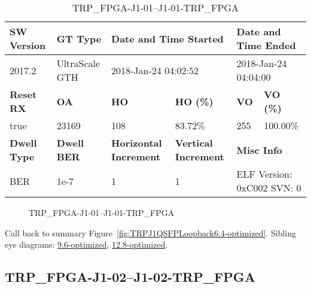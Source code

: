 \begin{table}[h]
\centering
\caption{TRP\_FPGA-J1-01--J1-01-TRP\_FPGA}
\label{tab:TRPFPGAJ101J101TRPFPGA6.4-optimized}
\begin{tabular}{@{}|l|l|l|l|l|l|@{}}
\toprule
\textbf{SW Version}                & \textbf{GT Type}   & \multicolumn{2}{l|}{\textbf{Date and Time Started}}            & \multicolumn{2}{l|}{\textbf{Date and Time Ended}}        \\ \midrule
2017.2                       & UltraScale GTH          & \multicolumn{2}{l|}{2018-Jan-24 04:02:52}                   & \multicolumn{2}{l|}{2018-Jan-24 04:04:00}               \\ \midrule
\textbf{Reset RX}                  & \textbf{OA} & \textbf{HO}   & \textbf{HO (\%)} & \textbf{VO} & \textbf{VO (\%)} \\ \midrule
true & 23169        & 108          & 83.72\%        & 255        & 100.00\%       \\ \midrule
\textbf{Dwell Type}                & \textbf{Dwell BER} & \textbf{Horizontal Increment} & \textbf{Vertical Increment}    & \multicolumn{2}{l|}{\textbf{Misc Info}}                  \\ \midrule
BER                            & 1e-7        & 1        & 1           & \multicolumn{2}{l|}{ELF Version: 0xC002 SVN: 0}                         \\ \bottomrule
\end{tabular}
\end{table}

\begin{figure}[h]
\caption{TRP\_FPGA-J1-01--J1-01-TRP\_FPGA} \label{fig:TRPFPGAJ101J101TRPFPGA6.4-optimized}
\end{figure}

Call back to summary Figure~\ref{fig:TRPJ1QSFPLoopback6.4-optimized}.
Sibling eye diagrams: \hyperref[sec:TRPFPGAJ101J101TRPFPGA9.6-optimized]{9.6-optimized}, \hyperref[sec:TRPFPGAJ101J101TRPFPGA12.8-optimized]{12.8-optimized}.

\clearpage
\newpage


\subsection{TRP\_FPGA-J1-02--J1-02-TRP\_FPGA}\label{sec:TRPFPGAJ102J102TRPFPGA6.4-optimized}

